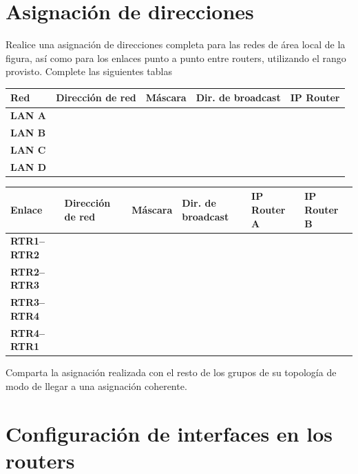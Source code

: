 \documentclass[a4paper,10pt]{article}
\begin{document}
\vfill

\section{Asignación de direcciones}

Realice una asignación de direcciones completa para las redes de área local de la figura, así como para los enlaces punto a punto entre routers, utilizando el rango provisto. Complete las siguientes tablas
    
    \begin{center}
        \bigskip
        \begin{tabular}{|p{1cm}|p{3cm}|p{3cm}|p{3cm}|p{3cm}|}
            \hline
            \textbf{Red} & \textbf{Dirección de red} & \textbf{Máscara} & \textbf{Dir. de broadcast} & \textbf{IP Router} \\ \hline
            \textbf{LAN A} & & & & \\ \hline
            \textbf{LAN B} & & & & \\ \hline
            \textbf{LAN C} & & & & \\ \hline
            \textbf{LAN D} & & & & \\ \hline
        \end{tabular}
    \end{center}

    \bigskip
    \begin{center}
        \begin{tabular}{|p{2cm}|p{2.5cm}|p{2.5cm}|p{2.6cm}|p{2.4cm}|p{2.4cm}|}
            \hline
            \textbf{Enlace} & \textbf{Dirección de red} & \textbf{Máscara} & \textbf{Dir. de broadcast} & \textbf{IP Router A} & \textbf{IP Router B} \\ \hline
            \textbf{RTR1--RTR2} & & & & & \\ \hline
            \textbf{RTR2--RTR3} & & & & & \\ \hline
            \textbf{RTR3--RTR4} & & & & & \\ \hline
            \textbf{RTR4--RTR1} & & & & & \\ \hline
        \end{tabular}
    \bigskip
    \end{center}

    Comparta la asignación realizada con el resto de los grupos de su topología de modo de llegar a una asignación coherente.

\section{Configuración de interfaces en los routers}
\end{document}
